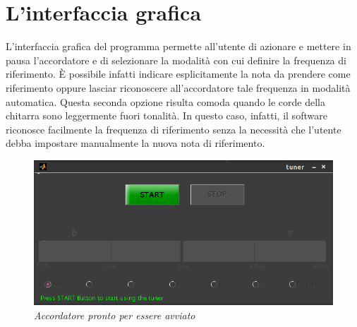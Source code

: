 \chapter{L'interfaccia grafica}\label{cap:interfaccia}

L'interfaccia grafica del programma permette all'utente di azionare e mettere in pausa l'accordatore e di selezionare la modalità con cui definire la frequenza di riferimento.
È possibile infatti indicare esplicitamente la nota da prendere come riferimento oppure lasciar riconoscere all'accordatore tale frequenza in modalità automatica.
Questa seconda opzione risulta comoda quando le corde della chitarra sono leggermente fuori tonalità.
In questo caso, infatti, il software riconosce facilmente la frequenza di riferimento senza la necessità che l'utente debba impostare manualmente la nuova nota di riferimento.

	\begin{figure}[h]
	  \begin{center} 
	    \includegraphics[width=\textwidth*\real{0.8}]{images/ch_07/accordatore_fermo.png}
	  \end{center} 
	  \caption{\textit{Accordatore pronto per essere avviato}}  
	  \label{fig:accordatore_fermo}
	\end{figure}

